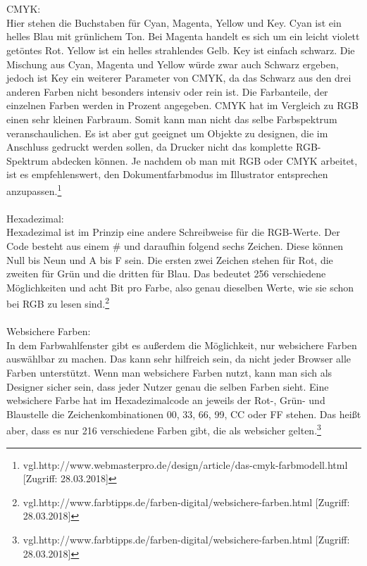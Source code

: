 \leavevmode \\
\leavevmode \\
CMYK:
\leavevmode \\
Hier stehen die Buchstaben für Cyan, Magenta, Yellow und Key. Cyan ist ein helles Blau mit grünlichem Ton. Bei Magenta handelt es sich um ein leicht violett getöntes Rot. Yellow ist ein helles strahlendes Gelb. Key ist einfach schwarz. Die Mischung aus Cyan, Magenta und Yellow würde zwar auch Schwarz ergeben, jedoch ist Key ein weiterer Parameter von CMYK, da das Schwarz aus den drei anderen Farben nicht besonders intensiv oder rein ist. Die Farbanteile, der einzelnen Farben werden in Prozent angegeben. CMYK hat im Vergleich zu RGB einen sehr kleinen Farbraum. Somit kann man nicht das selbe Farbspektrum veranschaulichen. Es ist aber gut geeignet um Objekte zu designen, die im Anschluss gedruckt werden sollen, da Drucker nicht das komplette RGB-Spektrum abdecken können. Je nachdem ob man mit RGB oder CMYK arbeitet, ist es empfehlenswert, den Dokumentfarbmodus im Illustrator entsprechen anzupassen.\footnote{\label{} vgl.http://www.webmasterpro.de/design/article/das-cmyk-farbmodell.html [Zugriff: 28.03.2018]}
\leavevmode \\
\leavevmode \\
Hexadezimal:
\leavevmode \\
Hexadezimal ist im Prinzip eine andere Schreibweise für die RGB-Werte. Der Code besteht aus einem \# und daraufhin folgend sechs Zeichen. Diese können Null bis Neun und A bis F sein. Die ersten zwei Zeichen stehen für Rot, die zweiten für Grün und die dritten für Blau. Das bedeutet 256 verschiedene Möglichkeiten und acht Bit pro Farbe, also genau dieselben Werte, wie sie schon bei RGB zu lesen sind.\footnote{\label{} vgl.http://www.farbtipps.de/farben-digital/websichere-farben.html [Zugriff: 28.03.2018]}
\leavevmode \\
\leavevmode \\
Websichere Farben:
\leavevmode \\
In dem Farbwahlfenster gibt es außerdem die Möglichkeit, nur websichere Farben auswählbar zu machen. Das kann sehr hilfreich sein, da nicht jeder Browser alle Farben unterstützt. Wenn man websichere Farben nutzt, kann man sich als Designer sicher sein, dass jeder Nutzer genau die selben Farben sieht. Eine websichere Farbe hat im Hexadezimalcode an jeweils der Rot-, Grün- und Blaustelle die Zeichenkombinationen 00, 33, 66, 99, CC oder FF stehen. Das heißt aber, dass es nur 216 verschiedene Farben gibt, die als websicher gelten.\footnote{\label{} vgl.http://www.farbtipps.de/farben-digital/websichere-farben.html [Zugriff: 28.03.2018]}
